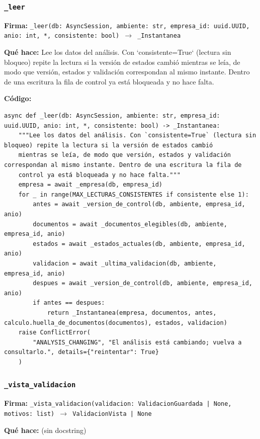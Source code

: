 \documentclass[11pt,a4paper]{article}
\begin{document}
\subsubsection*{\texttt{\_leer}}
\textbf{Firma:} \texttt{\_leer(db: AsyncSession, ambiente: str, empresa\_id: uuid.UUID, anio: int, *, consistente: bool) $\rightarrow$ \_Instantanea}

\textbf{Qué hace:} Lee los datos del análisis. Con `consistente=True` (lectura sin bloqueo) repite la lectura si la versión de estados cambió
mientras se leía, de modo que versión, estados y validación correspondan al mismo instante. Dentro de una escritura la fila de
control ya está bloqueada y no hace falta.

\textbf{Código:}
\begin{lstlisting}
async def _leer(db: AsyncSession, ambiente: str, empresa_id: uuid.UUID, anio: int, *, consistente: bool) -> _Instantanea:
    """Lee los datos del análisis. Con `consistente=True` (lectura sin bloqueo) repite la lectura si la versión de estados cambió
    mientras se leía, de modo que versión, estados y validación correspondan al mismo instante. Dentro de una escritura la fila de
    control ya está bloqueada y no hace falta."""
    empresa = await _empresa(db, empresa_id)
    for _ in range(MAX_LECTURAS_CONSISTENTES if consistente else 1):
        antes = await _version_de_control(db, ambiente, empresa_id, anio)
        documentos = await _documentos_elegibles(db, ambiente, empresa_id, anio)
        estados = await _estados_actuales(db, ambiente, empresa_id, anio)
        validacion = await _ultima_validacion(db, ambiente, empresa_id, anio)
        despues = await _version_de_control(db, ambiente, empresa_id, anio)
        if antes == despues:
            return _Instantanea(empresa, documentos, antes, calculo.huella_de_documentos(documentos), estados, validacion)
    raise ConflictError(
        "ANALYSIS_CHANGING", "El análisis está cambiando; vuelva a consultarlo.", details={"reintentar": True}
    )
\end{lstlisting}

\subsubsection*{\texttt{\_vista\_validacion}}
\textbf{Firma:} \texttt{\_vista\_validacion(validacion: ValidacionGuardada | None, motivos: list) $\rightarrow$ ValidacionVista | None}

\textbf{Qué hace:} (sin docstring)
\end{document}
